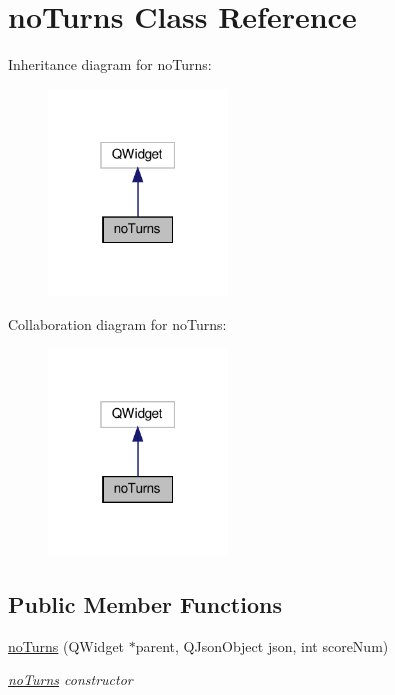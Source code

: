 \hypertarget{classnoTurns}{}\section{no\+Turns Class Reference}
\label{classnoTurns}


Inheritance diagram for no\+Turns\+:
\nopagebreak
\begin{figure}[H]
\begin{center}
\leavevmode
\includegraphics[width=135pt]{classnoTurns__inherit__graph}
\end{center}
\end{figure}


Collaboration diagram for no\+Turns\+:
\nopagebreak
\begin{figure}[H]
\begin{center}
\leavevmode
\includegraphics[width=135pt]{classnoTurns__coll__graph}
\end{center}
\end{figure}
\subsection*{Public Member Functions}
\begin{DoxyCompactItemize}
\item 
\hyperlink{classnoTurns_a602def6b039215fd6035a4b8d349b571}{no\+Turns} (Q\+Widget $\ast$parent, Q\+Json\+Object json, int score\+Num)
\begin{DoxyCompactList}\small\item\em \hyperlink{classnoTurns}{no\+Turns} constructor \end{DoxyCompactList}\end{DoxyCompactItemize}


